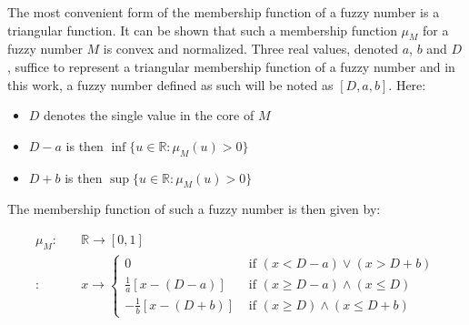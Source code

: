 
%  

The most convenient form of the membership function of a fuzzy number is a triangular function. It can be shown that such a membership function $\mu_M$ for a fuzzy number $M$ is convex and normalized. Three real values, denoted $a$, $b$ and $D$, suffice to represent a triangular membership function of a fuzzy number and in this work, a fuzzy number defined as such will be noted as $\left[D, a, b \right]$. Here:
\begin{itemize}
\item
$D$ denotes the single value in the core of $M$
\item
$D-a$ is then $\inf \{u \in \mathbb{R} : \mu_{M}(u) > 0\}$
\item
$D+b$ is then $\sup \{u \in \mathbb{R} : \mu_{M}(u) > 0\}$
\end{itemize}

The membership function of such a fuzzy number is then given by:

\vspace{-10pt}

\begin{align}
\mu_M : & \quad \mathbb{R} \rightarrow \left[0,1\right] \nonumber\\
 : & \quad x \rightarrow
\begin{cases}
0 & \mbox{ if } \left(x < D-a\right) \vee \left(x > D+b\right) \\
\frac{1}{a}\left[x-\left(D-a\right)\right] & \mbox{ if } \left(x \geq D-a\right) \wedge (x \leq D)  \\
-\frac{1}{b}\left[x-\left(D+b\right)\right] & \mbox{ if } \left(x \geq D\right) \wedge (x \leq D+b)
\end{cases}
\end{align}

